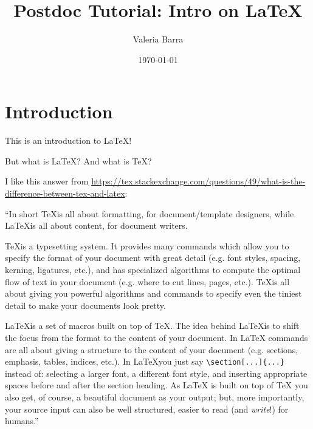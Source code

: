 \documentclass{article}
\title{Postdoc Tutorial: Intro on \LaTeX}
\author{Valeria Barra}
\date{\today}
\begin{document}
\maketitle

\tableofcontents

\listoffigures
 
\listoftables

\clearpage

\section[Intro]{Introduction}

This is an introduction to \LaTeX!

But what is \LaTeX? And what is \TeX?

I like this answer from \url{https://tex.stackexchange.com/questions/49/what-is-the-difference-between-tex-and-latex}:

\vspace{\baselineskip} %

\noindent ``In short \TeX is all about formatting, for document/template designers, while \LaTeX is all about content, for document writers.

\noindent \TeX is a typesetting system. It provides many commands which allow you to specify the format of your document with great detail (e.g. font styles, spacing, kerning, ligatures, etc.), and has specialized algorithms to compute the optimal flow of text in your document (e.g. where to cut lines, pages, etc.). \TeX is all about giving you powerful algorithms and commands to specify even the tiniest detail to make your documents look pretty.

\noindent \LaTeX is a set of macros built on top of \TeX. The idea behind \LaTeX is to shift the focus from the format to the content of your document. In LaTeX commands are all about giving a structure to the content of your document (e.g. sections, emphasis, tables, indices, etc.). In \LaTeX you just say \texttt{\textbackslash section[...]\{...\}} instead of: selecting a larger font, a different font style, and inserting appropriate spaces before and after the section heading. As LaTeX is built on top of TeX you also get, of course, a beautiful document as your output; but, more importantly, your source input can also be well structured, easier to read (and \emph{write}!) for humans.''
\end{document}
